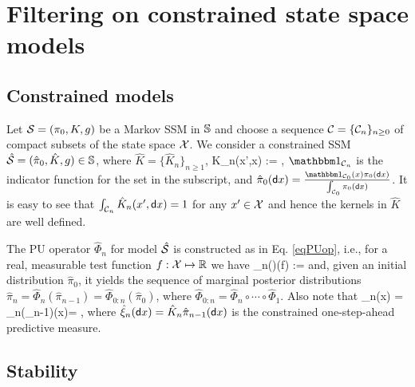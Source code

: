 \documentclass[onefignum,onetabnum]{siamonline250211}%
\begin{document}
%
\section{Filtering on constrained state space models} \label{sConstrained}

%
\subsection{Constrained models} \label{ssConstrainedModels}

Let ${\mathcal S} = (\pi_0, K, g)$ be a Markov SSM in $\mathbb{S}$ and choose a sequence ${\mathcal C}=\{{\mathcal C}_n\}_{n \ge 0}$ of compact subsets of the state space ${\mathcal X}$. We %
consider a constrained SSM $\hat {{\mathcal S}} = (\hat \pi_0,\hat K,g) \in \mathbb{S}$, where $\hat K=\{\hat K_n\}_{n\ge 1}$,
\beq
\hat K_n(x',\sd x) := ,
\label{eqBasicConstraint}
\eeq
$\Ind_{\mC_n}$ is the indicator function for the set in the subscript, and $\hat\pi_0(\sd x) = \frac{\Ind_{\mC_0}(x)\pi_0(\sd x)}{\int_{\mC_0} \pi_0(\sd x)}$.
It is easy to see that $\int_{{\mathcal C}_n} \hat K_n(x',{\sf d} x) = 1$ for any $x'\in{\mathcal X}$ and hence the kernels in $\hat K$ are well defined. %

The PU operator $\hat\Phi_n$ for model $\hat{{\mathcal S}}$ is constructed as in Eq. \eqref{eqPUop}, i.e., for a real, measurable test function $f:{\mathcal X}\mapsto\mathbb{R}$ we have 
\beq
\hat\Phi_n(\mu)(f) := 
\label{eqCPUop}
\eeq
and, given an initial distribution $\hat\pi_0$, it yields the sequence of marginal posterior distributions $\hat\pi_n = \hat\Phi_n(\hat\pi_{n-1}) = \hat \Phi_{0:n}(\hat\pi_0)$, where $\hat\Phi_{0:n}=\hat\Phi_n \circ \cdots \circ \hat\Phi_1$. Also note that
\beq
\hat\pi_n(\sd x) = \hat\Phi_n(\hat\pi_{n-1})(\sd x)= ,
\nn
\eeq
where $\hat\xi_n({\sf d} x) = \hat K_n\hat\pi_{n-1}({\sf d} x)$ is the constrained one-step-ahead predictive measure.


%
\subsection{Stability}
\end{document}
